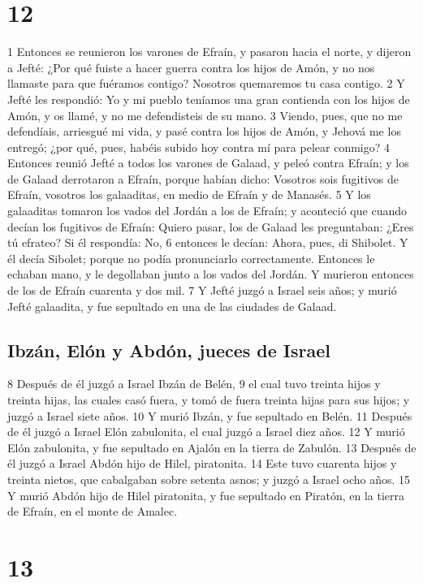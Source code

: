 \chapter{12}


1 Entonces se reunieron los varones de Efraín, y pasaron hacia el norte, y dijeron a Jefté: ¿Por qué fuiste a hacer guerra contra los hijos de Amón, y no nos llamaste para que fuéramos contigo? Nosotros quemaremos tu casa contigo.
2 Y Jefté les respondió: Yo y mi pueblo teníamos una gran contienda con los hijos de Amón, y os llamé, y no me defendisteis de su mano.
3 Viendo, pues, que no me defendíais, arriesgué mi vida, y pasé contra los hijos de Amón, y Jehová me los entregó; ¿por qué, pues, habéis subido hoy contra mí para pelear conmigo?
4 Entonces reunió Jefté a todos los varones de Galaad, y peleó contra Efraín; y los de Galaad derrotaron a Efraín, porque habían dicho: Vosotros sois fugitivos de Efraín, vosotros los galaaditas, en medio de Efraín y de Manasés.
5 Y los galaaditas tomaron los vados del Jordán a los de Efraín; y aconteció que cuando decían los fugitivos de Efraín: Quiero pasar, los de Galaad les preguntaban: ¿Eres tú efrateo? Si él respondía: No,
6 entonces le decían: Ahora, pues, di Shibolet. Y él decía Sibolet; porque no podía pronunciarlo correctamente. Entonces le echaban mano, y le degollaban junto a los vados del Jordán. Y murieron entonces de los de Efraín cuarenta y dos mil.
7 Y Jefté juzgó a Israel seis años; y murió Jefté galaadita, y fue sepultado en una de las ciudades de Galaad.
\section*{Ibzán, Elón y Abdón, jueces de Israel}

8 Después de él juzgó a Israel Ibzán de Belén,
9 el cual tuvo treinta hijos y treinta hijas, las cuales casó fuera, y tomó de fuera treinta hijas para sus hijos; y juzgó a Israel siete años.
10 Y murió Ibzán, y fue sepultado en Belén.
11 Después de él juzgó a Israel Elón zabulonita, el cual juzgó a Israel diez años.
12 Y murió Elón zabulonita, y fue sepultado en Ajalón en la tierra de Zabulón.
13 Después de él juzgó a Israel Abdón hijo de Hilel, piratonita.
14 Este tuvo cuarenta hijos y treinta nietos, que cabalgaban sobre setenta asnos; y juzgó a Israel ocho años.
15 Y murió Abdón hijo de Hilel piratonita, y fue sepultado en Piratón, en la tierra de Efraín, en el monte de Amalec.

\chapter{13}

